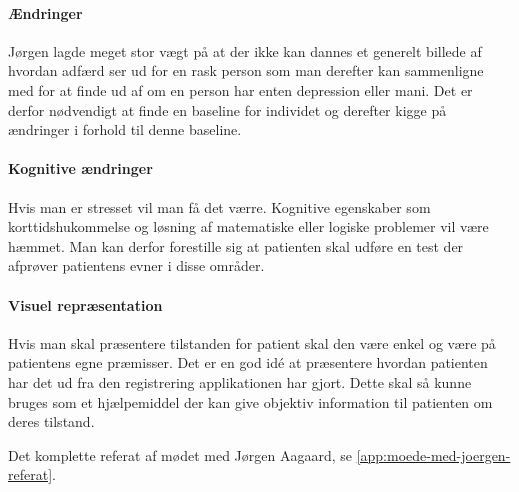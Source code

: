 \paragraph{Ændringer}
Jørgen lagde meget stor vægt på at der ikke kan dannes et generelt billede af hvordan adfærd ser ud for en rask person som man derefter kan sammenligne med for at finde ud af om en person har enten depression eller mani.
Det er derfor nødvendigt at finde en baseline for individet og derefter kigge på ændringer i forhold til denne baseline.

\paragraph{Kognitive ændringer}
Hvis man er stresset vil man få det værre. 
Kognitive egenskaber som korttidshukommelse og løsning af matematiske eller logiske problemer vil være hæmmet.
Man kan derfor forestille sig at patienten skal udføre en test der afprøver patientens evner i disse områder.

\paragraph{Visuel repræsentation}
Hvis man skal præsentere tilstanden for patient skal den være enkel og være på patientens egne præmisser. Det er en god idé at præsentere hvordan patienten har det ud fra den registrering applikationen har gjort. Dette skal så kunne bruges som et hjælpemiddel der kan give objektiv information til patienten om deres tilstand.

Det komplette referat af mødet med Jørgen Aagaard, se \cref{app:moede-med-joergen-referat}.